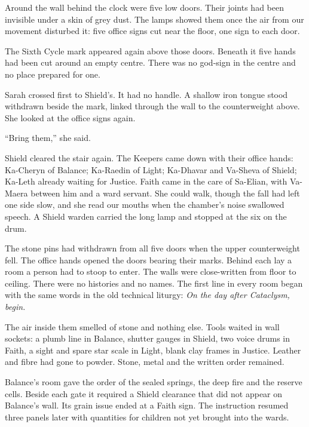 Around the wall behind the clock were five low doors. Their joints had been invisible under a skin of grey dust. The lamps showed them once the air from our movement disturbed it: five office signs cut near the floor, one sign to each door.\par

The Sixth Cycle mark appeared again above those doors. Beneath it five hands had been cut around an empty centre. There was no god-sign in the centre and no place prepared for one.\par

Sarah crossed first to Shield's. It had no handle. A shallow iron tongue stood withdrawn beside the mark, linked through the wall to the counterweight above. She looked at the office signs again.\par

``Bring them,'' she said.\par

Shield cleared the stair again. The Keepers came down with their office hands: Ka-Cheryn of Balance; Ka-Raedin of Light; Ka-Dhavar and Va-Sheva of Shield; Ka-Leth already waiting for Justice. Faith came in the care of Sa-Elian, with Va-Maera between him and a ward servant. She could walk, though the fall had left one side slow, and she read our mouths when the chamber's noise swallowed speech. A Shield warden carried the long lamp and stopped at the six on the drum.\par

The stone pins had withdrawn from all five doors when the upper counterweight fell. The office hands opened the doors bearing their marks. Behind each lay a room a person had to stoop to enter. The walls were close-written from floor to ceiling. There were no histories and no names. The first line in every room began with the same words in the old technical liturgy: \emph{On the day after Cataclysm, begin.}\par

The air inside them smelled of stone and nothing else. Tools waited in wall sockets: a plumb line in Balance, shutter gauges in Shield, two voice drums in Faith, a sight and spare star scale in Light, blank clay frames in Justice. Leather and fibre had gone to powder. Stone, metal and the written order remained.\par

\ornament

Balance's room gave the order of the sealed springs, the deep fire and the reserve cells. Beside each gate it required a Shield clearance that did not appear on Balance's wall. Its grain issue ended at a Faith sign. The instruction resumed three panels later with quantities for children not yet brought into the wards.\par

